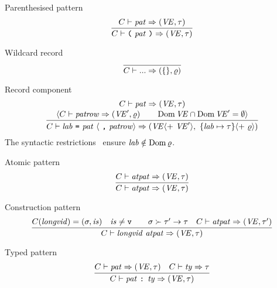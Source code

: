 \begin{sml-rule}{Parenthesised pattern}
\begin{equation}\label{rule:static-core:paren-pattern}
  \vcenter{\infer{\C\ts\parpat\ra(\VE,\tau)}
    {\C\ts\pat\ra(\VE,\tau)}}
\end{equation}
\end{sml-rule}


\begin{sml-rule}{Wildcard record}
\begin{equation}\label{rule:static-core:wildcard-record}
\vcenter{\infer{\C\ts\wildcardrow\ra(\emptymap,\varrho)}{}}
\end{equation}
\end{sml-rule}

\begin{sml-rule}{Record component}
\begin{equation}\label{rule:static-core:record-component}
  \vcenter{\infer{\C\ts\longlabpats\ra
     (\VE\optional{ +\ \VE'\rangle,\ \{\lab\mapsto\tau\}\langle +\ \varrho})}
    {\deduce{\optional{\C\ts\labpats\ra(\VE',\varrho)\qquad\Dom\VE\cap\Dom\VE' = \emptyset}}
      {\C\ts\pat\ra(\VE,\tau)}}}
\end{equation}
The syntactic restrictions~ ensure $\textit{lab\/}\notin\mathop{\rm Dom}\nolimits\varrho$.
\end{sml-rule}


\begin{sml-rule}{Atomic pattern}
\begin{equation}\label{rule:static-core:atomic-pattern}
  \vcenter{\infer{\C\ts\atpat\ra (\VE,\tau)}
    {\C\ts\atpat\ra (\VE,\tau)}}
\end{equation}
\end{sml-rule}

\begin{sml-rule}{Construction pattern}
\begin{equation}\label{rule:static-core:construction-pattern}
  \vcenter{\infer{\C\ts\vidpat\ra (\VE,\tau)}
    {\C(\longvid) = (\sigma, \is)
      & \is\neq\isv\qquad \sigma\succ\tau'\to\tau
      & \C\ts\atpat\ra(\VE,\tau')}}
\end{equation}
\end{sml-rule}

\begin{sml-rule}{Typed pattern}
\begin{equation}\label{rule:static-core:typed-pattern}
  \vcenter{\infer{\C\ts\typedpat\ra (\VE,\tau)}
    {\C\ts\pat\ra(\VE,\tau)
      & \C\ts\ty\ra\tau}}
\end{equation}
\end{sml-rule}

